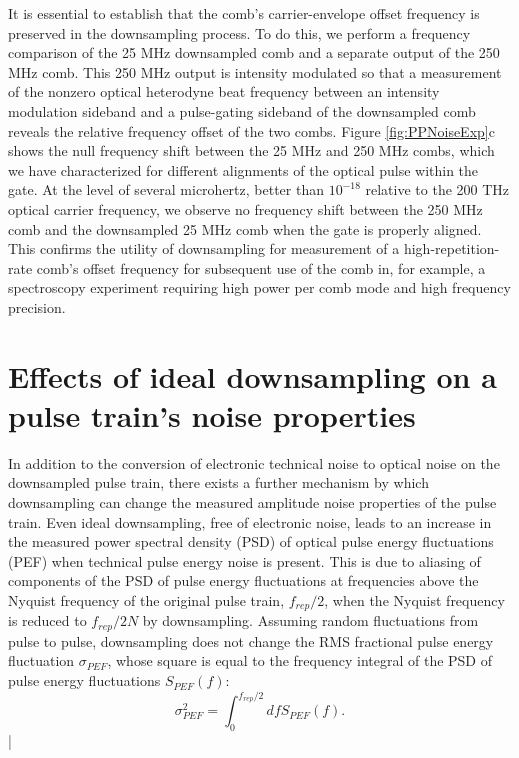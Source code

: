 It is essential to establish that the comb's carrier-envelope offset frequency is preserved in the downsampling process. To do this, we perform a frequency comparison of the 25 MHz downsampled comb and a separate output of the 250 MHz comb. This 250 MHz output is intensity modulated so that a measurement of the nonzero optical heterodyne beat frequency between an intensity modulation sideband and a pulse-gating sideband of the downsampled comb reveals the relative frequency offset of the two combs. Figure \ref{fig:PPNoiseExp}c shows the null frequency shift between the 25 MHz and 250 MHz combs, which we have characterized for different alignments of the optical pulse within the gate. At the level of several microhertz, better than $10^{-18}$ relative to the 200 THz optical carrier frequency, we observe no frequency shift between the 250 MHz comb and the downsampled 25 MHz comb when the gate is properly aligned. This confirms the utility of downsampling for measurement of a high-repetition-rate comb's offset frequency for subsequent use of the comb in, for example, a spectroscopy experiment requiring high power per comb mode and high frequency precision.

\section{Effects of ideal downsampling on a pulse train's noise properties}\label{sec:PPNoiseTheory}

In addition to the conversion of electronic technical noise to optical noise on the downsampled pulse train, there exists a further mechanism by which downsampling can change the measured amplitude noise properties of the pulse train. Even ideal downsampling, free of electronic noise, leads to an increase in the measured power spectral density (PSD) of optical pulse energy fluctuations (PEF) when technical pulse energy noise is present. This is due to aliasing of components of the PSD of pulse energy fluctuations at frequencies above the Nyquist frequency of the original pulse train, $f_{rep}/2$, when the Nyquist frequency is reduced to $f_{rep}/2N$ by downsampling. Assuming random fluctuations from pulse to pulse, downsampling does not change the RMS fractional pulse energy fluctuation $\sigma_{PEF}$, whose square is equal to the frequency integral of the PSD of pulse energy fluctuations $S_{PEF} (f)$:
\begin{equation}
\sigma_{PEF}^2=\int_{0}^{f_{rep}/2}df S_{PEF} (f).         
\end{equation}| 
                       
